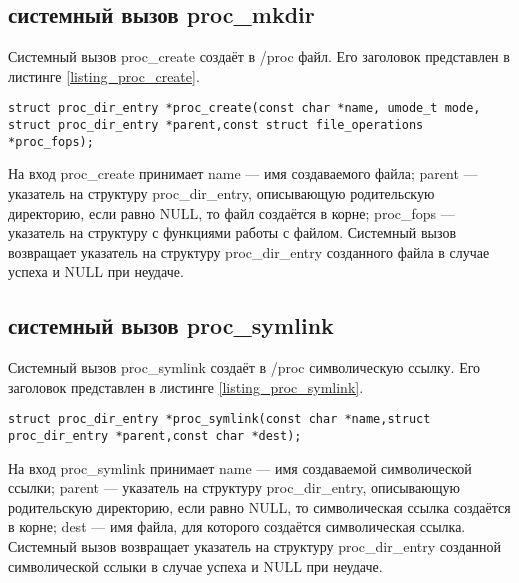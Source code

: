 \subsection{системный вызов proc\_mkdir}

Системный вызов proc\_create создаёт в /proc файл.
Его заголовок представлен в листинге \ref{listing_proc_create}.
\begin{center}
	\begin{lstlisting}[label=listing_proc_create,caption=Заголовок системного вызова proc\_create]
struct proc_dir_entry *proc_create(const char *name, umode_t mode, struct proc_dir_entry *parent,const struct file_operations *proc_fops);
	\end{lstlisting}
\end{center}
На вход proc\_create принимает name --- имя создаваемого файла; parent --- указатель на структуру proc\_dir\_entry, описывающую родительскую директорию, если равно NULL, то файл создаётся в корне; proc\_fops --- указатель на структуру с функциями работы с файлом.
Системный вызов возвращает указатель на структуру proc\_dir\_entry созданного файла в случае успеха и NULL при неудаче.

\subsection{системный вызов proc\_symlink}

Системный вызов proc\_symlink создаёт в /proc символическую ссылку.
Его заголовок представлен в листинге \ref{listing_proc_symlink}.
\begin{center}
	\begin{lstlisting}[label=listing_proc_symlink,caption=Заголовок системного вызова proc\_symlink]
struct proc_dir_entry *proc_symlink(const char *name,struct proc_dir_entry *parent,const char *dest);
	\end{lstlisting}
\end{center}
На вход proc\_symlink принимает name --- имя создаваемой символической ссылки; parent --- указатель на структуру proc\_dir\_entry, описывающую родительскую директорию, если равно NULL, то символическая ссылка создаётся в корне; dest --- имя файла, для которого создаётся символическая ссылка.
Системный вызов возвращает указатель на структуру proc\_dir\_entry созданной символической сслыки в случае успеха и NULL при неудаче.
